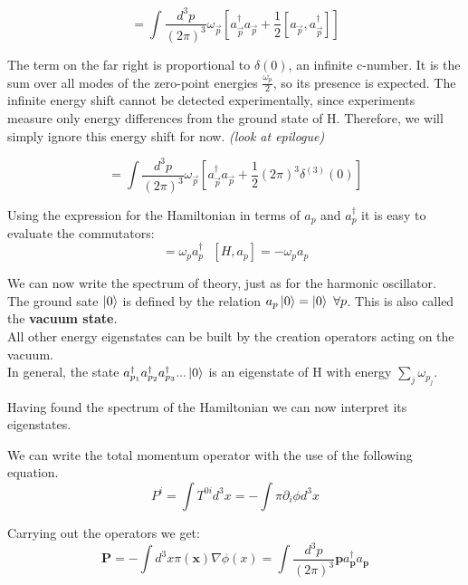\documentclass{article}
\newcommand{\A}{a^\dagger}
\begin{document}
\begin{equation}
    =\int \frac{d^{3}p}{(2\pi)^{3}}\omega_{\vec{p}}[a_{\vec{p}}^{\dagger}a_{\vec{p}}+\frac{1}{2}[a_{\vec{p}},a_{\vec{p}}^{\dagger}]]
\end{equation}


The term on the far right is proportional to $\delta(0)$, an infinite c-number. It is the sum over all modes of the zero-point energies $\frac{\omega_p}{2}$, so its presence is expected. The infinite energy shift cannot be detected experimentally, since experiments measure only energy differences from the ground state of H. Therefore, we will simply ignore this energy shift for now. \textit{(look at epilogue)}

\begin{equation}
    =\int \frac{d^{3}p}{(2\pi)^{3}}\omega_{\vec{p}}[a_{\vec{p}}^{\dagger}a_{\vec{p}}+\frac{1}{2}(2\pi)^{3}\delta^{(3)}(0)]
\end{equation}



Using the expression for the Hamiltonian in terms of $a_p$ and $\A_p$ it is easy to evaluate the commutators:
\begin{equation}
    [H,\A_p] = \omega_p \A_p\ \ \ [H,a_p] = -\omega_p a_p
\end{equation}

We can now write the spectrum of theory, just as for the harmonic oscillator.
\\
The ground sate $\ket{0}$ is defined by the relation $a_p\ket{0} = \ket{0}\ \forall p$. This is also called the \textbf{vacuum state}.\\
All other energy eigenstates can be built by the creation operators acting on the vacuum.\\
In general, the state $\A_{p_1}\A_{p_2}\A_{p_3}...\ket{0}$ is an eigenstate of H with energy $\sum\limits_j \omega_{p_j}$.\newline\newline


Having found the spectrum of the Hamiltonian we can now interpret its eigenstates.

We can write the total momentum operator with the use of the following equation.
\begin{equation}
    P^i = \int T^{0i}d^3x = -\int \pi \partial_i\phi d^3x
\end{equation}

Carrying out the operators we get:
\\
\begin{equation}
    \textbf{P} = -\int d^3x \pi(\textbf{x})\nabla\phi(x) = \int \frac{d^3p}{(2\pi)^3} \textbf{p}\A_\textbf{p} a_\textbf{p}
\end{equation}
\end{document}
